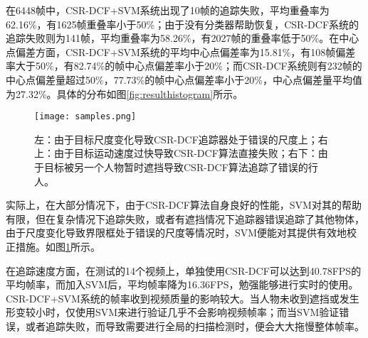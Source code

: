   在6448帧中，CSR-DCF+SVM系统出现了10帧的追踪失败，平均重叠率为62.16\%，有1625帧重叠率小于50\%；由于没有分类器帮助恢复，CSR-DCF系统的追踪失败则为141帧，平均重叠率为58.26\%，有2027帧的重叠率低于50\%。在中心点偏差方面，CSR-DCF+SVM系统的平均中心点偏差率为15.81\%，有108帧偏差率大于50\%，有82.74\%的帧中心点偏差率小于20\%；而CSR-DCF系统则有232帧的中心点偏差量超过50\%，77.73\%的帧中心点偏差率小于20\%，中心点偏差量平均值为27.32\%。具体的分布如图\ref{fig:resulthistogram}所示。



\begin{figure}[htb]
  \centering
  \texttt{[image: samples.png]}
  \caption{左：由于目标尺度变化导致CSR-DCF追踪器处于错误的尺度上；右上：由于目标运动速度过快导致CSR-DCF算法直接失败；右下：由于目标被另一个人物暂时遮挡导致CSR-DCF算法追踪了错误的行人。}
  \label{fig:samples}
\end{figure}

  实际上，在大部分情况下，由于CSR-DCF算法自身良好的性能，SVM对其的帮助有限，但在复杂情况下追踪失败，或者有遮挡情况下追踪器错误追踪了其他物体，由于尺度变化导致界限框处于错误的尺度等情况时，SVM便能对其提供有效地校正措施。如图\ref{fig:samples}所示。


  在追踪速度方面，在测试的14个视频上，单独使用CSR-DCF可以达到40.78FPS的平均帧率，而加入SVM后，平均帧率降为16.36FPS，勉强能够进行实时的使用。CSR-DCF+SVM系统的帧率收到视频质量的影响较大。当人物未收到遮挡或发生形变较小时，仅使用SVM来进行验证几乎不会影响视频帧率；而当SVM验证错误，或者追踪失败，而导致需要进行全局的扫描检测时，便会大大拖慢整体帧率。